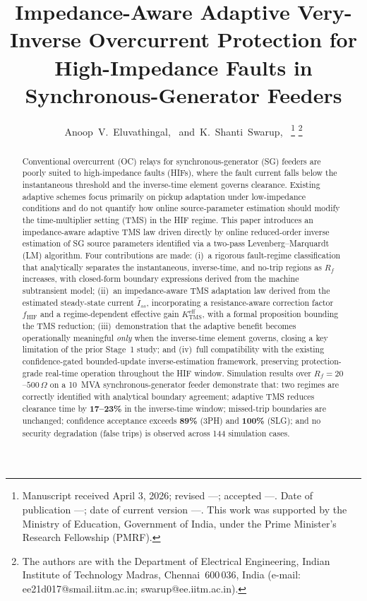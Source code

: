 \documentclass[10pt,journal,twoside]{IEEEtran}
\title{Impedance-Aware Adaptive Very-Inverse Overcurrent Protection
       for High-Impedance Faults in Synchronous-Generator Feeders}
\author{Anoop~V.~Eluvathingal,~\IEEEmembership{Student Member,~IEEE,}
        and~K.~Shanti~Swarup,~\IEEEmembership{Senior Member,~IEEE}%
\thanks{Manuscript received April 3, 2026; revised ---; accepted ---.
        Date of publication ---; date of current version ---.
        This work was supported by the Ministry of Education, Government
        of India, under the Prime Minister's Research Fellowship (PMRF).}%
\thanks{The authors are with the Department of Electrical Engineering,
        Indian Institute of Technology Madras, Chennai~600\,036, India
        (e-mail: ee21d017@smail.iitm.ac.in; swarup@ee.iitm.ac.in).}}
\newcommand{\Rf}{R_{\!f}}
\newcommand{\Iss}{\hat{I}_{ss}}
\newcommand{\fhif}{f_{\mathrm{HIF}}}
\newcommand{\Keff}{K_{\mathrm{TMS}}^{\mathrm{eff}}}
\begin{document}

\maketitle

\begin{abstract}
Conventional overcurrent (OC) relays for synchronous-generator (SG) feeders
are poorly suited to high-impedance faults (HIFs), where the fault current
falls below the instantaneous threshold and the inverse-time element governs
clearance.  Existing adaptive schemes focus primarily on pickup adaptation
under low-impedance conditions and do not quantify how online source-parameter
estimation should modify the time-multiplier setting (TMS) in the HIF regime.
This paper introduces an impedance-aware adaptive TMS law driven directly by
online reduced-order inverse estimation of SG source parameters identified via
a two-pass Levenberg--Marquardt (LM) algorithm.  Four contributions are made:
(i)~a rigorous fault-regime classification that analytically separates the
instantaneous, inverse-time, and no-trip regions as $\Rf$ increases, with
closed-form boundary expressions derived from the machine subtransient model;
(ii)~an impedance-aware TMS adaptation law derived from the estimated
steady-state current $\Iss$, incorporating a resistance-aware correction factor
$\fhif$ and a regime-dependent effective gain $\Keff$, with a formal
proposition bounding the TMS reduction; (iii)~demonstration that the adaptive
benefit becomes operationally meaningful \emph{only} when the inverse-time
element governs, closing a key limitation of the prior Stage~1 study; and
(iv)~full compatibility with the existing confidence-gated bounded-update
inverse-estimation framework, preserving protection-grade real-time operation
throughout the HIF window.
Simulation results over $\Rf = 20$--$500\,\Omega$ on a 10~MVA
synchronous-generator feeder demonstrate that: two regimes are correctly
identified with analytical boundary agreement; adaptive TMS reduces clearance
time by \textbf{17--23\%} in the inverse-time window; missed-trip boundaries
are unchanged; confidence acceptance exceeds \textbf{89\%} (3PH) and
\textbf{100\%} (SLG); and no security
degradation (false trips) is observed across 144 simulation cases.
\end{abstract}
\end{document}
